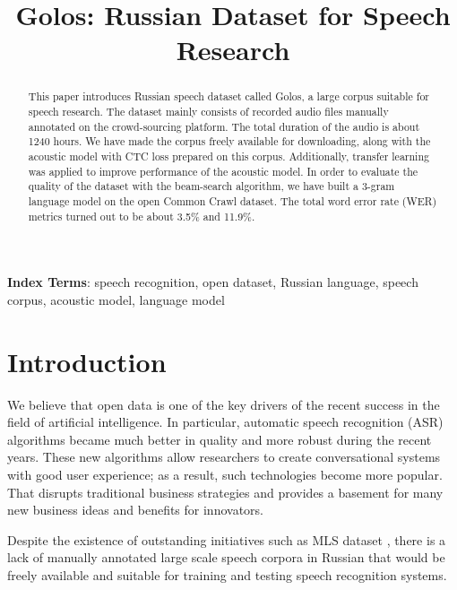 \documentclass[a4paper]{article}
\title{Golos: Russian Dataset for Speech Research}
\begin{document}
\maketitle
% 
\begin{abstract}
 
This paper introduces Russian speech dataset called Golos, a large corpus suitable for speech research. The dataset mainly consists of recorded audio files manually annotated on the crowd-sourcing platform. The total duration of the audio is about 1240 hours. We have made the corpus freely available for downloading, along with the acoustic model with CTC loss prepared on this corpus. Additionally, transfer learning was applied to improve performance of the acoustic model. In order to evaluate the quality of the dataset with the beam-search algorithm, we have built a 3-gram language model on the open Common Crawl dataset. The total word error rate (WER) metrics turned out to be about 3.5\% and 11.9\%.

\end{abstract}
\noindent\textbf{Index Terms}: speech recognition, open dataset, Russian language, speech corpus, acoustic model, language model

\section{Introduction}
We believe that open data is one of the key drivers of the recent success in the field of artificial intelligence. In particular, automatic speech recognition (ASR) algorithms became much better in quality and more robust during the recent years. These new algorithms allow researchers to create conversational systems with good user experience; as a result, such technologies become more popular. That disrupts traditional business strategies and provides a basement for many new business ideas and benefits for innovators. 
  
Despite the existence of outstanding initiatives such as MLS dataset \cite{pratap2020mls}, there is a lack of manually annotated large scale speech corpora in Russian that would be freely available and suitable for training and testing speech recognition systems.
 
\end{document}
